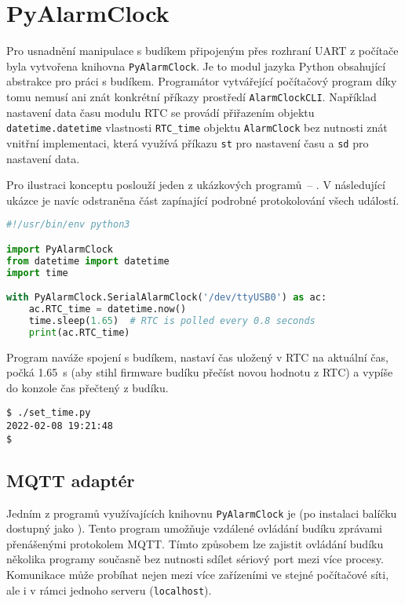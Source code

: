 \section{PyAlarmClock}
Pro usnadnění manipulace s budíkem připojeným přes rozhraní UART z počítače
byla vytvořena knihovna \texttt{PyAlarmClock}. Je to modul jazyka Python
obsahující abstrakce pro práci s budíkem. Programátor vytvářející počítačový
program díky tomu nemusí ani znát konkrétní příkazy prostředí
\texttt{AlarmClockCLI}. Například nastavení data času modulu RTC se provádí
přiřazením objektu \texttt{datetime.datetime} vlastnosti \verb|RTC_time|
objektu \texttt{AlarmClock} bez nutnosti znát vnitřní implementaci, která
využívá příkazu \texttt{st} pro nastavení času a \texttt{sd} pro nastavení
data.

Pro ilustraci konceptu poslouží jeden z ukázkových programů~--
. V následující ukázce je navíc
odstraněna část zapínající podrobné protokolování všech událostí.
\begin{lstlisting}[language=Python,style=numbers]
#!/usr/bin/env python3

import PyAlarmClock
from datetime import datetime
import time

with PyAlarmClock.SerialAlarmClock('/dev/ttyUSB0') as ac:
    ac.RTC_time = datetime.now()
    time.sleep(1.65)  # RTC is polled every 0.8 seconds
    print(ac.RTC_time)
\end{lstlisting}
Program naváže spojení s budíkem, nastaví čas uložený v RTC na aktuální čas,
počká \SI{1,65}{\second} (aby stihl firmware budíku přečíst novou hodnotu
z RTC) a vypíše do konzole čas přečtený z budíku.
\begin{lstlisting}[style=terminal]
$ ./set_time.py
2022-02-08 19:21:48
$
\end{lstlisting}


\subsection{MQTT adaptér}
Jedním z programů využívajících knihovnu \texttt{PyAlarmClock} je
 (po instalaci balíčku
dostupný jako ). Tento program umožňuje vzdálené ovládání
budíku zprávami přenášenými protokolem MQTT. Tímto způsobem lze zajistit
ovládání budíku několika programy současně bez nutnosti sdílet sériový port
mezi více procesy. Komunikace může probíhat nejen mezi více zařízeními ve
stejné počítačové síti, ale i v rámci jednoho serveru (\texttt{localhost}).

